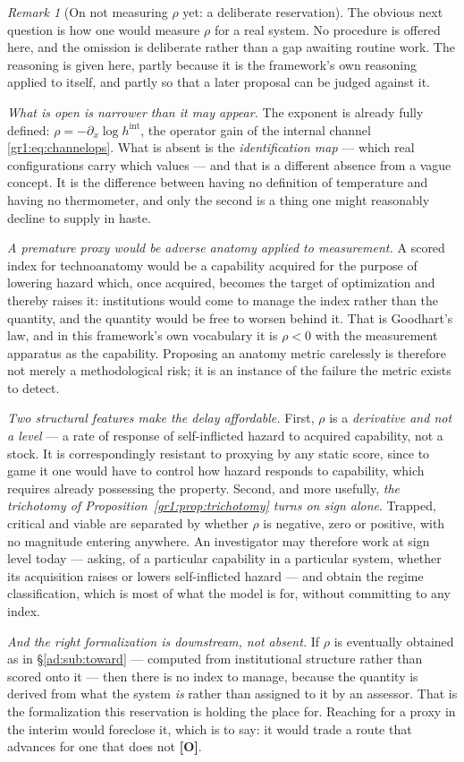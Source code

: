 \documentclass[11pt]{article}
\numberwithin{equation}{section}
\theoremstyle{plain}
\theoremstyle{definition}
\theoremstyle{remark}
\newtheorem{remark}[theorem]{Remark}
\begin{document}
\begin{remark}[On not measuring $\rho$ yet: a deliberate reservation]
\label{gr1:rem:noproxy}
The obvious next question is how one would measure $\rho$ for a real
system. No procedure is offered here, and the omission is deliberate
rather than a gap awaiting routine work. The reasoning is given here, partly because it is the framework's own reasoning applied to itself,
and partly so that a later proposal can be judged against it.

\emph{What is open is narrower than it may appear.} The exponent is
already fully defined: $\rho=-\partial_x\log h^{\mathrm{int}}$, the
operator gain of the internal channel \eqref{gr1:eq:channelops}. What is
absent is the \emph{identification map} --- which real configurations
carry which values --- and that is a different absence from a vague
concept. It is the difference between having no definition of
temperature and having no thermometer, and only the second is a thing
one might reasonably decline to supply in haste.

\emph{A premature proxy would be adverse anatomy applied to
measurement.} A scored index for technoanatomy would be a capability
acquired for the purpose of lowering hazard which, once acquired,
becomes the target of optimization and thereby raises it: institutions
would come to manage the index rather than the quantity, and the
quantity would be free to worsen behind it. That is Goodhart's law, and
in this framework's own vocabulary it is $\rho<0$ with the measurement
apparatus as the capability. Proposing an anatomy metric carelessly is
therefore not merely a methodological risk; it is an instance of the
failure the metric exists to detect.

\emph{Two structural features make the delay affordable.} First,
$\rho$ is a \emph{derivative and not a level} --- a rate of response of
self-inflicted hazard to acquired capability, not a stock. It is
correspondingly resistant to proxying by any static score, since to
game it one would have to control how hazard responds to capability,
which requires already possessing the property. Second, and more
usefully, \emph{the trichotomy of Proposition~\ref{gr1:prop:trichotomy}
turns on sign alone}. Trapped, critical and viable are separated by
whether $\rho$ is negative, zero or positive, with no magnitude
entering anywhere. An investigator may therefore work at sign level
today --- asking, of a particular capability in a particular system,
whether its acquisition raises or lowers self-inflicted hazard --- and
obtain the regime classification, which is most of what the model is
for, without committing to any index.

\emph{And the right formalization is downstream, not absent.} If $\rho$
is eventually obtained as in \S\ref{ad:sub:toward} --- computed from
institutional structure rather than scored onto it --- then there is no
index to manage, because the quantity is derived from what the system
\emph{is} rather than assigned to it by an assessor. That is the
formalization this reservation is holding the place for. Reaching for a
proxy in the interim would foreclose it, which is to say: it would
trade a route that advances for one that does not \textbf{[O]}.
\end{remark}
\end{document}
